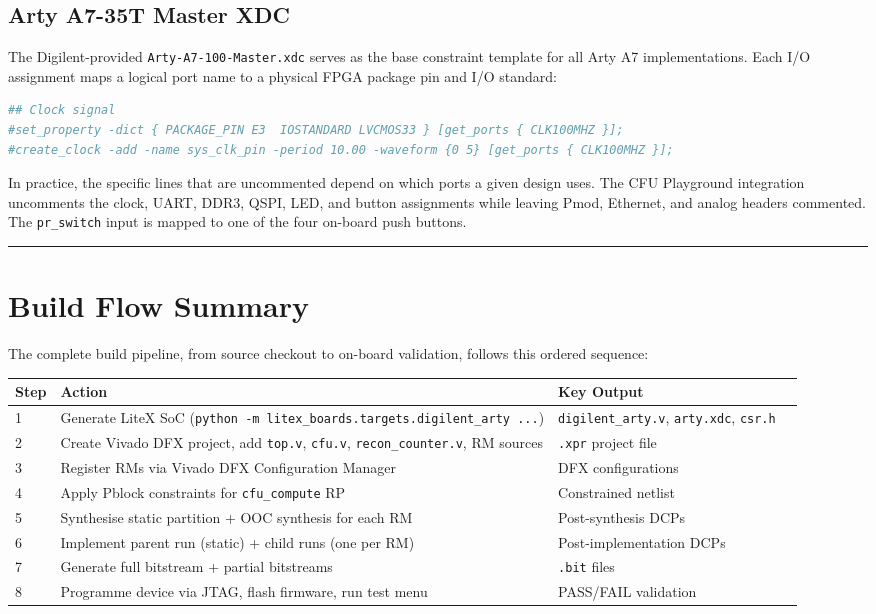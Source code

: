 \subsection{Arty A7-35T Master XDC}

The Digilent-provided \texttt{Arty-A7-100-Master.xdc} serves as the base constraint template for all Arty A7 implementations. Each I/O assignment maps a logical port name to a physical FPGA package pin and I/O standard:

\begin{lstlisting}[style=mystyle, language=tcl]
## Clock signal
#set_property -dict { PACKAGE_PIN E3  IOSTANDARD LVCMOS33 } [get_ports { CLK100MHZ }];
#create_clock -add -name sys_clk_pin -period 10.00 -waveform {0 5} [get_ports { CLK100MHZ }];
\end{lstlisting}

In practice, the specific lines that are uncommented depend on which ports a given design uses. The CFU Playground integration uncomments the clock, UART, DDR3, QSPI, LED, and button assignments while leaving Pmod, Ethernet, and analog headers commented. The \texttt{pr\_switch} input is mapped to one of the four on-board push buttons.

\vspace{0.4em}\hrule\vspace{0.4em}

\section{Build Flow Summary}

The complete build pipeline, from source checkout to on-board validation, follows this ordered sequence:

\begin{table}[htbp]
\centering
\begin{tabularx}{\textwidth}{X X X X}
\toprule
Step & Action & Key Output \\
\midrule
1 & Generate LiteX SoC (\texttt{python -m litex\_boards.targets.digilent\_arty ...}) & \texttt{digilent\_arty.v}, \texttt{arty.xdc}, \texttt{csr.h} \\
2 & Create Vivado DFX project, add \texttt{top.v}, \texttt{cfu.v}, \texttt{recon\_counter.v}, RM sources & \texttt{.xpr} project file \\
3 & Register RMs via Vivado DFX Configuration Manager & DFX configurations \\
4 & Apply Pblock constraints for \texttt{cfu\_compute} RP & Constrained netlist \\
5 & Synthesise static partition + OOC synthesis for each RM & Post-synthesis DCPs \\
6 & Implement parent run (static) + child runs (one per RM) & Post-implementation DCPs \\
7 & Generate full bitstream + partial bitstreams & \texttt{.bit} files \\
8 & Programme device via JTAG, flash firmware, run test menu & PASS/FAIL validation \\
\bottomrule
\end{tabularx}
\end{table}


